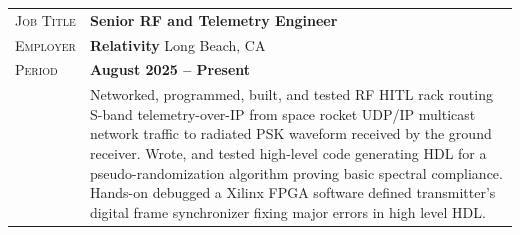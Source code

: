 \documentclass[a4paper, oneside, final]{scrartcl}
\newcommand{\gray}{\rowcolor[gray]{.90}} %
\begin{document}
\begin{center}
\begin{tabularx}{0.97\linewidth}{>{\raggedleft\scshape}p{2cm}X}
\gray Job Title & \textbf{Senior RF and Telemetry Engineer}\\
\gray Employer & \textbf{Relativity} \hfill Long Beach, CA\\
\gray Period & \textbf{August 2025 -- Present}\\
&
\vspace{-0.15 cm}
Networked, programmed, built, and tested RF HITL rack routing S-band telemetry-over-IP from space rocket UDP/IP multicast network traffic to radiated PSK waveform received by the ground receiver.
\newline
\newline
Wrote, and tested high-level code generating HDL for a pseudo-randomization algorithm proving basic spectral compliance.   
Hands-on debugged a Xilinx FPGA software defined transmitter's digital frame synchronizer fixing major errors in high level HDL.
\newline
\end{tabularx}



\end{center}
\end{document}
